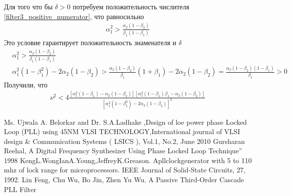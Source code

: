 \documentclass[a4paper,14pt]{extarticle} %
\begin{document}
Для того что бы $\delta > 0$ потребуем положительность числителя \eqref{filter3_positive_numerator}, что равносильно
 \begin{equation}
 \begin{aligned}
\alpha_1^2 > \frac{\alpha_2(1-\beta_2)}{\beta_1(1-\beta_1)}
 \end{aligned}
 \end{equation}
Это условие гарантирует положительность знаменателя и $\delta$
 \begin{equation}
 \begin{aligned}
&\alpha_1^2 > \frac{\alpha_2(1-\beta_2)}{\beta_1(1-\beta_1)}\\
&\alpha_1^2(1-\beta_1^2) - 2\alpha_2(1-\beta_2) > \frac{\alpha_2(1-\beta_2)}{\beta_1}(1+\beta_1) - 2\alpha_2(1-\beta_2)= \frac{\alpha_2(1-\beta_2)(1 - \beta_1)}{\beta_1} > 0
 \end{aligned}
 \end{equation}
Получили, что
 \begin{equation}
 \begin{aligned}
\nu^2 < 4\frac{[\alpha_1^2(1-\beta_1) - \alpha_2(1-\beta_2)][\alpha_1^2(1-\beta_1)\beta_1 - \alpha_2(1-\beta_2)]}{[\alpha_1^2(1-\beta_1^2) - 2\alpha_2(1-\beta_2)]^2}
 \end{aligned}
 \end{equation}

\newpage
\begin{thebibliography}{3}
Ms. Ujwala A. Belorkar  and Dr. S.A.Ladhake ,Dssign of loe power phase Locked Loop (PLL) using 45NM VLSI  TECHNOLOGY,International  journal of  VLSI  design  \&  Communication  Systems (  LSICS  ), Vol.1, No.2, June 2010
Gursharan Reehal, A Digital Frequency Synthesizer Using Phase Locked Loop Technique” 1998
 KengL.WongIanA.Young,JeffreyK.Greason. Apllclockgenerator with 5 to 110 mhz of lock range for microprocessors. IEEE Journal of Solid-State Circuits, 27, 1992. 
 Lin Feng, Chu Wu, Bo Jin, Zhen Yu Wu. A Passive Third-Order Cascade PLL Filter
\end{thebibliography}
\end{document}
